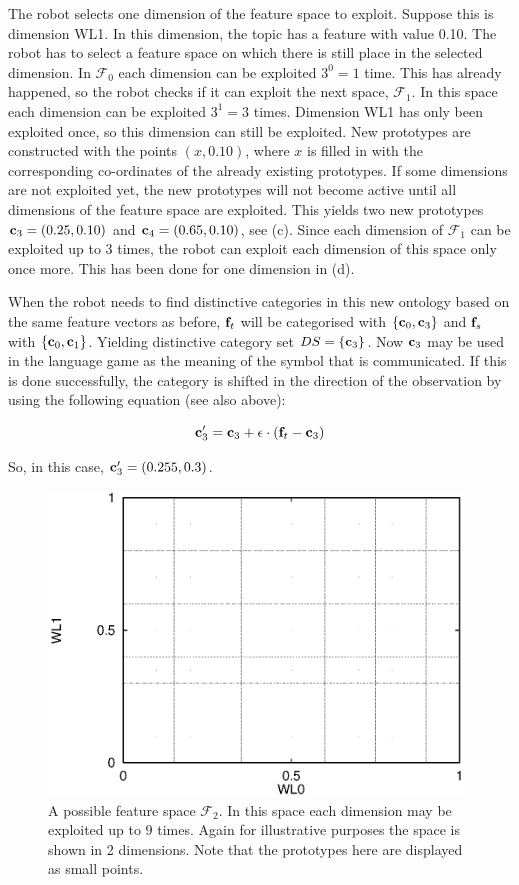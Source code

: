 The robot selects one dimension of the feature space to exploit. Suppose this is dimension WL1. In this dimension, the topic has a feature with value 0.10. The robot has to select a feature space on which there is still place in the selected dimension. In ${\mathcal F}_0$ each dimension can be exploited $3^0=1$ time. This has already happened, so the robot checks if it can exploit the next space, ${\mathcal F}_1$. In this space each dimension can be exploited $3^1=3$ times. Dimension WL1 has only been exploited once, so this dimension can still be exploited. New prototypes are constructed with the points $(x,0.10)$, where $x$ is filled in with the corresponding co-ordinates of the already existing prototypes. If some dimensions are not exploited yet, the new prototypes will not become active until all dimensions of the feature space are exploited. This yields two new prototypes ${\bf c}_3=(0.25,0.10)$ and ${\bf c}_4=(0.65,0.10)$, see  (c). Since each dimension of ${\mathcal F}_1$ can be exploited up to 3 times, the robot can exploit each dimension of this space only once more. This has been done for one dimension in  (d).

When the robot needs to find distinctive categories in this new ontology based on the same feature vectors as before, ${\bf f}_t$ will be categorised with $\{{\bf c}_0,{\bf c}_3\}$ and ${\bf f}_s$ with $\{{\bf c}_0,{\bf c}_1\}$. Yielding distinctive category set $DS=\{{\bf c}_3\}$. Now ${\bf c}_3$ may be used in the language game as the meaning of the symbol that is communicated. If this is done successfully, the category is shifted in the direction of the observation by using the following equation (see also above):

\[
{\bf c}_3' = {\bf c}_3 + \epsilon \cdot ({\bf f}_t - {\bf c}_3)
\]


So, in this case, ${\bf c}_3'=(0.255,0.3)$.

\begin{figure}
\centerline{\includegraphics[width=11cm]{lang_games/proto3.eps}}
\caption{A possible feature space ${\mathcal F}_2$. In this space each dimension may be exploited up to 9 times. Again for illustrative purposes the space is shown in 2 dimensions. Note that the prototypes here are displayed as small points.}
\label{f:lg:proto2}
\end{figure}


